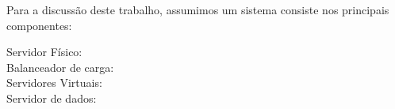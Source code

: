 


Para a discussão deste trabalho, assumimos um sistema consiste nos principais componentes:

\begin{description}
	\item[Servidor Físico:]
	\item[Balanceador de carga:]
	\item[Servidores Virtuais:]
	\item[Servidor de dados:]	
\end{description}

